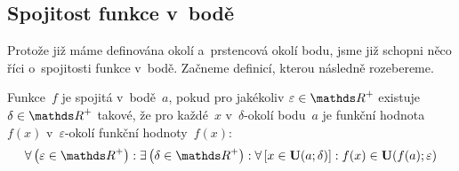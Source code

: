 \subsection{Spojitost funkce v~bodě}
\label{subsec:limita-spojitost-v-bode}

Protože již máme definována okolí a~prstencová okolí bodu, jsme již schopni něco říci
o~spojitosti funkce v~bodě. Začneme definicí, kterou následně rozebereme.

\begin{definition}
    \label{def:funkce-spojitost-v-bode}
    Funkce~$f$ je spojitá v~bodě~$a$, pokud pro jakékoliv ${\varepsilon \in \positive\reals}$
    existuje ${\delta \in \positive{\reals}}$ takové, že pro každé~$x$ v~$\delta$-okolí
    bodu~$a$ je funkční hodnota~$f(x)$ v~$\varepsilon$-okolí funkční hodnoty~$f(x)$:
    \begin{equation*}
        \forall \left( \varepsilon \in \positive{\reals} \right) :
        \exists \left( \delta \in \positive{\reals} \right) :
        \forall \left[ x \in \ptngb(a; \delta) \right] :
        f(x) \in \ptngb(f(a); \varepsilon)
    \end{equation*}
\end{definition}
